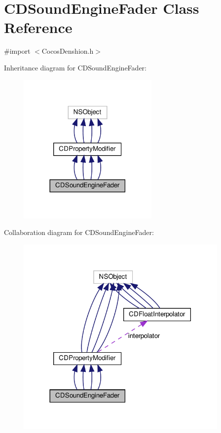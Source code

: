 \hypertarget{interfaceCDSoundEngineFader}{}\section{C\+D\+Sound\+Engine\+Fader Class Reference}
\label{interfaceCDSoundEngineFader}


{\ttfamily \#import $<$Cocos\+Denshion.\+h$>$}



Inheritance diagram for C\+D\+Sound\+Engine\+Fader\+:
\nopagebreak
\begin{figure}[H]
\begin{center}
\leavevmode
\includegraphics[width=194pt]{interfaceCDSoundEngineFader__inherit__graph}
\end{center}
\end{figure}


Collaboration diagram for C\+D\+Sound\+Engine\+Fader\+:
\nopagebreak
\begin{figure}[H]
\begin{center}
\leavevmode
\includegraphics[width=294pt]{interfaceCDSoundEngineFader__coll__graph}
\end{center}
\end{figure}
